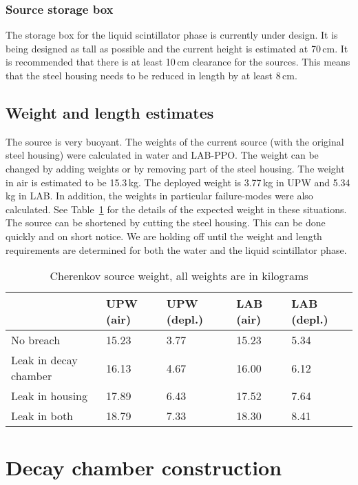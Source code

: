 \subsubsection{Source storage box}
The storage box for the liquid scintillator phase is currently under design. It is being designed as tall as possible and the current height is estimated at 70\,cm. It is recommended that there is at least 10\,cm clearance for the sources. This means that the steel housing needs to be reduced in length by at least 8\,cm.
\subsection{Weight and length estimates}
The source is very buoyant. The weights of the current source (with the original steel housing) were calculated in water and LAB-PPO. The weight can be changed by adding weights or by removing part of the steel housing. The weight in air is estimated to be 15.3\,kg. The deployed weight is 3.77\,kg in UPW and 5.34\,kg in LAB. In addition, the weights in particular failure-modes were also calculated. See Table~\ref{tab:weights} for the details of the expected weight in these situations.
The source can be shortened by cutting the steel housing. This can be done quickly and on short notice. We are holding off until the weight and length requirements are determined for both the water and the liquid scintillator phase. 

\begin{table}[h!]
\centering
\begin{tabular}{|l|l|l|l|l|} \hline
                & UPW (air)     & UPW (depl.)   & LAB (air)     & LAB (depl.)   \\ \hline
No breach       & 15.23         & 3.77              & 15.23         & 5.34              \\ \hline
Leak in
decay chamber   & 16.13         & 4.67              & 16.00         & 6.12              \\ \hline
Leak in
housing         & 17.89         & 6.43              & 17.52         & 7.64              \\ \hline
Leak in
both          & 18.79         & 7.33              & 18.30         & 8.41              \\ \hline
\end{tabular}
\caption{\label{tab:weights} Cherenkov source weight, all weights are in kilograms}
\end{table}

\section{Decay chamber construction}
\label{chap:construction}

